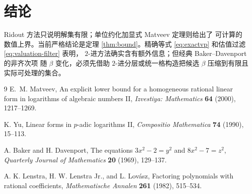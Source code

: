 \documentclass[11pt,a4paper]{ctexart}
\theoremstyle{remark}
\begin{document}
\section{结论}

Ridout 方法只说明解集有限；单位约化加显式 Matveev 定理则给出了
可计算的数值上界。当前严格结论是定理 \ref{thm:bound}。精确等式
\eqref{eq:exactvp} 和估值过滤 \eqref{eq:valuation-filter} 表明，
\(2\)-进方法确实含有额外信息；但经典 Baker--Davenport 的非齐次项
随 \(\beta\) 变化，必须先借助 \(2\)-进分层或统一格构造把候选
\(\beta\) 压缩到有限且实际可处理的集合。

\begin{thebibliography}{9}
E.~M. Matveev,
An explicit lower bound for a homogeneous rational linear form in logarithms
of algebraic numbers II,
\emph{Izvestiya: Mathematics} \textbf{64} (2000), 1217--1269.

K. Yu,
Linear forms in \(p\)-adic logarithms II,
\emph{Compositio Mathematica} \textbf{74} (1990), 15--113.

A. Baker and H. Davenport,
The equations \(3x^2-2=y^2\) and \(8x^2-7=z^2\),
\emph{Quarterly Journal of Mathematics} \textbf{20} (1969), 129--137.

A. K. Lenstra, H. W. Lenstra Jr., and L. Lov\'asz,
Factoring polynomials with rational coefficients,
\emph{Mathematische Annalen} \textbf{261} (1982), 515--534.
\end{thebibliography}
\end{document}

